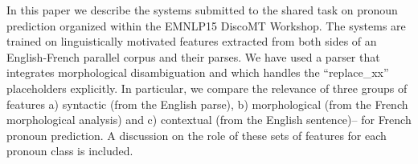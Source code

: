 In this paper we describe the systems submitted to the shared task on pronoun prediction organized within the EMNLP15 DiscoMT Workshop. The systems are trained on linguistically motivated features extracted from both sides of an English-French parallel corpus and their parses. We have used a parser that integrates morphological disambiguation and which handles the ``replace\_xx'' placeholders explicitly.  In particular, we compare the relevance of three groups of features a) syntactic (from the English parse), b) morphological (from the French morphological analysis) and c) contextual (from the English sentence)-- for French pronoun prediction. A discussion on the role of these sets of features for each pronoun class is included.
